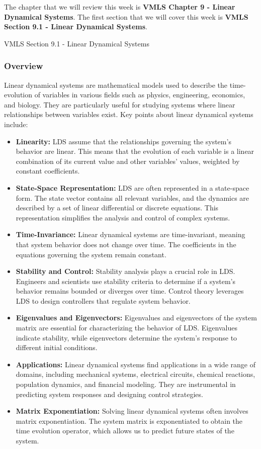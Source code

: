The chapter that we will review this week is \textbf{VMLS Chapter 9 - Linear Dynamical Systems}. The first section that we will cover this week is \textbf{VMLS Section 9.1 - Linear Dynamical Systems}.

\begin{notes}{VMLS Section 9.1 - Linear Dynamical Systems}
    \subsubsection*{Overview}

    Linear dynamical systems are mathematical models used to describe the time-evolution of variables in various fields such as physics, engineering, economics, and biology. They are particularly useful 
    for studying systems where linear relationships between variables exist. Key points about linear dynamical systems include:

    \begin{itemize}
        \item \textbf{Linearity:} LDS assume that the relationships governing the system's behavior are linear. This means that the evolution of each variable is a linear combination of its current value 
        and other variables' values, weighted by constant coefficients.
        \item \textbf{State-Space Representation:} LDS are often represented in a state-space form. The state vector contains all relevant variables, and the dynamics are described by a set of linear 
        differential or discrete equations. This representation simplifies the analysis and control of complex systems.
        \item \textbf{Time-Invariance:} Linear dynamical systems are time-invariant, meaning that system behavior does not change over time. The coefficients in the equations governing the system remain 
        constant.
        \item \textbf{Stability and Control:} Stability analysis plays a crucial role in LDS. Engineers and scientists use stability criteria to determine if a system's behavior remains bounded or diverges 
        over time. Control theory leverages LDS to design controllers that regulate system behavior.
        \item \textbf{Eigenvalues and Eigenvectors:} Eigenvalues and eigenvectors of the system matrix are essential for characterizing the behavior of LDS. Eigenvalues indicate stability, while 
        eigenvectors determine the system's response to different initial conditions.
        \item \textbf{Applications:} Linear dynamical systems find applications in a wide range of domains, including mechanical systems, electrical circuits, chemical reactions, population dynamics, 
        and financial modeling. They are instrumental in predicting system responses and designing control strategies.
        \item \textbf{Matrix Exponentiation:} Solving linear dynamical systems often involves matrix exponentiation. The system matrix is exponentiated to obtain the time evolution operator, which allows 
        us to predict future states of the system.
    \end{itemize}
    

\end{notes}
